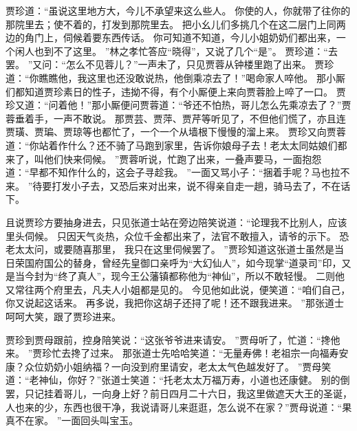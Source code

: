 贾珍道：“虽说这里地方大，今儿不承望来这么些人。
你使的人，你就带了往你的那院里去；使不着的，打发到那院里去。
把小幺儿们多挑几个在这二层门上同两边的角门上，伺候着要东西传话。
你可知道不知道，今儿小姐奶奶们都出来，一个闲人也到不了这里。
”林之孝忙答应“晓得”，又说了几个“是”。
贾珍道：“去罢。
”又问：“怎么不见蓉儿？”一声未了，只见贾蓉从钟楼里跑了出来。
贾珍道：“你瞧瞧他，我这里也还没敢说热，他倒乘凉去了！”喝命家人啐他。
那小厮们都知道贾珍素日的性子，违拗不得，有个小厮便上来向贾蓉脸上啐了一口。
贾珍又道：“问着他！”那小厮便问贾蓉道：“爷还不怕热，哥儿怎么先乘凉去了？”贾蓉垂着手，一声不敢说。
那贾芸、贾萍、贾芹等听见了，不但他们慌了，亦且连贾璜、贾㻞、贾琼等也都忙了，一个一个从墙根下慢慢的溜上来。
贾珍又向贾蓉道：“你站着作什么？还不骑了马跑到家里，告诉你娘母子去！老太太同姑娘们都来了，叫他们快来伺候。
”贾蓉听说，忙跑了出来，一叠声要马，一面抱怨道：“早都不知作什么的，这会子寻趁我。
”一面又骂小子：“捆着手呢？马也拉不来。
”待要打发小子去，又恐后来对出来，说不得亲自走一趟，骑马去了，不在话下。
\par
且说贾珍方要抽身进去，只见张道士站在旁边陪笑说道：“论理我不比别人，应该里头伺候。
只因天气炎热，众位千金都出来了，法官不敢擅入，请爷的示下。
恐老太太问，或要随喜那里，
我只在这里伺候罢了。
”贾珍知道这张道士虽然是当日荣国府国公的替身，曾经先皇御口亲呼为“大幻仙人”，如今现掌“道录司”印，又是当今封为“终了真人”，现今王公藩镇都称他为“神仙”，所以不敢轻慢。
二则他又常往两个府里去，凡夫人小姐都是见的。
今见他如此说，便笑道：“咱们自己，你又说起这话来。
再多说，我把你这胡子还挦了呢！还不跟我进来。
”那张道士呵呵大笑，跟了贾珍进来。
\par
贾珍到贾母跟前，控身陪笑说：“这张爷爷进来请安。
”贾母听了，忙道：“搀他来。
”贾珍忙去搀了过来。
那张道士先哈哈笑道：“无量寿佛！老祖宗一向福寿安康？众位奶奶小姐纳福？一向没到府里请安，老太太气色越发好了。
”贾母笑道：“老神仙，你好？”张道士笑道：“托老太太万福万寿，小道也还康健。
别的倒罢，只记挂着哥儿，一向身上好？前日四月二十六日，我这里做遮天大王的圣诞，
人也来的少，东西也很干净，我说请哥儿来逛逛，怎么说不在家？”贾母说道：“果真不在家。
”一面回头叫宝玉。
